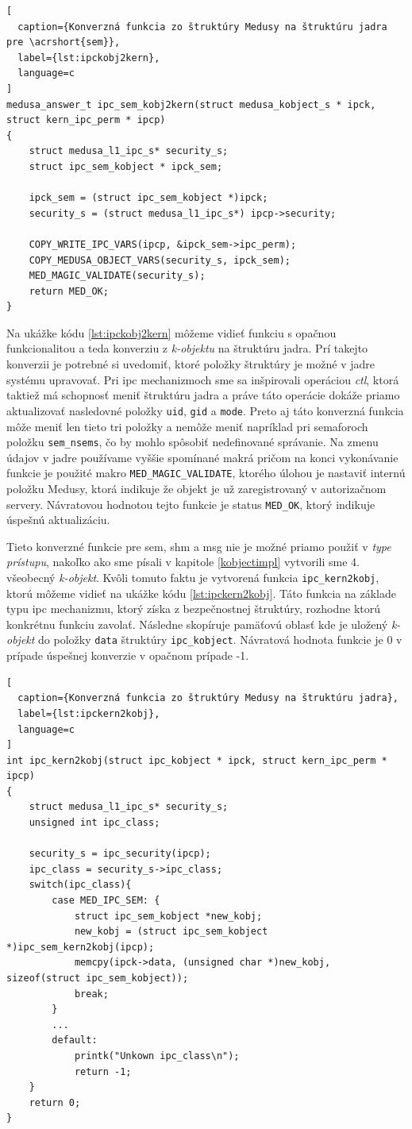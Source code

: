 \begin{lstlisting}[
  caption={Konverzná funkcia zo štruktúry Medusy na štruktúru jadra pre \acrshort{sem}},
  label={lst:ipckobj2kern},
  language=c
]
medusa_answer_t ipc_sem_kobj2kern(struct medusa_kobject_s * ipck, struct kern_ipc_perm * ipcp)
{
	struct medusa_l1_ipc_s* security_s;
	struct ipc_sem_kobject * ipck_sem;

	ipck_sem = (struct ipc_sem_kobject *)ipck;
	security_s = (struct medusa_l1_ipc_s*) ipcp->security;

	COPY_WRITE_IPC_VARS(ipcp, &ipck_sem->ipc_perm);
	COPY_MEDUSA_OBJECT_VARS(security_s, ipck_sem);
	MED_MAGIC_VALIDATE(security_s);
	return MED_OK;
}
\end{lstlisting}

Na ukážke kódu \ref{lst:ipckobj2kern} môžeme vidieť funkciu s opačnou funkcionalitou a teda konverziu z \textit{k-objektu} na štruktúru jadra. Prí takejto konverzii je potrebné si uvedomiť, ktoré položky štruktúry je možné v jadre systému upravovať. Pri \acrshort{ipc} mechanizmoch sme sa inšpirovali operáciou \textit{ctl}, ktorá taktiež má schopnosť meniť štruktúru jadra a práve táto operácie dokáže priamo aktualizovať nasledovné položky \texttt{uid}, \texttt{gid} a \texttt{mode}. Preto aj táto konverzná funkcia môže meniť len tieto tri položky a nemôže meniť napríklad pri semaforoch položku \texttt{sem\_nsems}, čo by mohlo spôsobiť nedefinované správanie. Na zmenu údajov v jadre používame vyššie spomínané makrá pričom na konci vykonávanie funkcie je použité makro \texttt{MED\_MAGIC\_VALIDATE}, ktorého úlohou je nastaviť internú položku Medusy, ktorá indikuje že objekt je už zaregistrovaný v autorizačnom servery. Návratovou hodnotou tejto funkcie je status \texttt{MED\_OK}, ktorý indikuje úspešnú aktualizáciu.

Tieto konverzné funkcie pre \acrshort{sem}, \acrshort{shm} a \acrshort{msg} nie je možné priamo použiť v \textit{type prístupu}, nakoľko ako sme písali v kapitole \ref{kobjectimpl} vytvorili sme 4. všeobecný \textit{k-objekt}. Kvôli tomuto faktu je vytvorená funkcia \texttt{ipc\_kern2kobj}, ktorú môžeme vidieť na ukážke kódu \ref{lst:ipckern2kobj}. Táto funkcia na základe typu \acrshort{ipc} mechanizmu, ktorý získa z  bezpečnostnej štruktúry, rozhodne ktorú konkrétnu funkciu zavolať. Následne skopíruje pamäťovú oblasť kde je uložený \textit{k-objekt} do položky \texttt{data} štruktúry \texttt{ipc\_kobject}. Návratová hodnota funkcie je 0 v prípade úspešnej konverzie v opačnom prípade -1.
\begin{lstlisting}[
  caption={Konverzná funkcia zo štruktúry Medusy na štruktúru jadra},
  label={lst:ipckern2kobj},
  language=c
]
int ipc_kern2kobj(struct ipc_kobject * ipck, struct kern_ipc_perm * ipcp)
{
	struct medusa_l1_ipc_s* security_s;
	unsigned int ipc_class;

	security_s = ipc_security(ipcp);
	ipc_class = security_s->ipc_class;
	switch(ipc_class){
		case MED_IPC_SEM: {
			struct ipc_sem_kobject *new_kobj;
			new_kobj = (struct ipc_sem_kobject *)ipc_sem_kern2kobj(ipcp);
			memcpy(ipck->data, (unsigned char *)new_kobj, sizeof(struct ipc_sem_kobject));
			break;
		}
		...
		default:
			printk("Unkown ipc_class\n");
			return -1;		
	}
	return 0;
}
\end{lstlisting}
